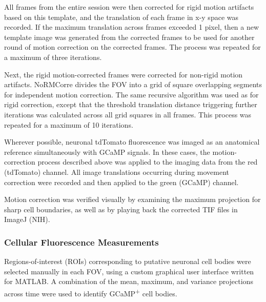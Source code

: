 All frames from the entire session were then corrected for rigid motion artifacts based on this template, and the translation of each frame in x-y space was recorded. If the maximum translation across frames exceeded 1 pixel, then a new template image was generated from the corrected frames to be used for another round of motion correction on the corrected frames. The process was repeated for a maximum of three iterations.

Next, the rigid motion-corrected frames were corrected for non-rigid motion artifacts. NoRMCorre divides the FOV into a grid of square overlapping segments for independent motion correction. The same recursive algorithm was used as for rigid correction, except that the threshold translation distance triggering further iterations was calculated across all grid squares in all frames. This process was repeated for a maximum of 10 iterations.


Wherever possible, neuronal tdTomato fluorescence was imaged as an anatomical reference simultaneously with GCaMP signals. In these cases, the motion-correction process described above was applied to the imaging data from the red (tdTomato) channel. All image translations occurring during movement correction were recorded and then applied to the green (GCaMP) channel.

Motion correction was verified visually by examining the maximum projection for sharp cell boundaries, as well as by playing back the corrected TIF files in ImageJ (NIH).   

\subsubsection*{Cellular Fluorescence Measurements}
\hypertarget{methods_dFF}{}

Regions-of-interest (ROIs) corresponding to putative neuronal cell bodies were selected manually in each FOV, using a custom graphical user interface written for MATLAB. A combination of the mean, maximum, and variance projections across time were used to identify GCaMP\textsuperscript{+} cell bodies. 

